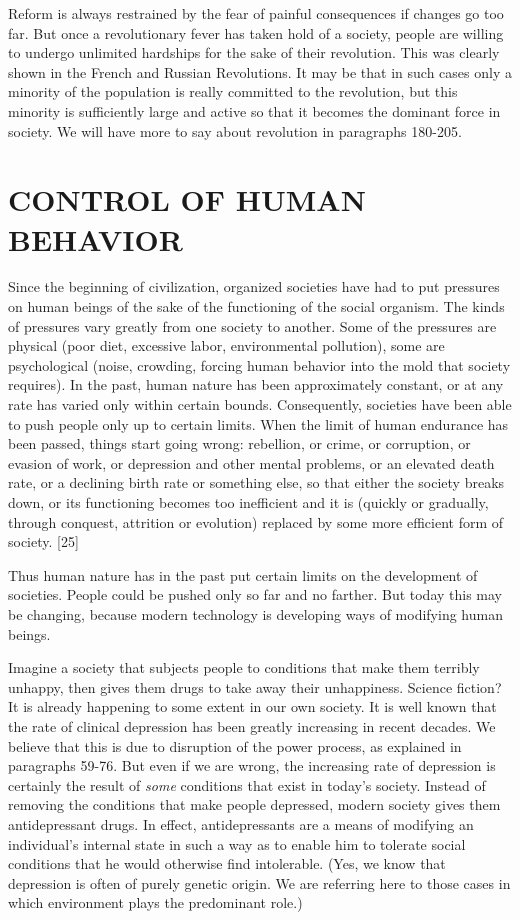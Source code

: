  Reform is always restrained by the fear of painful consequences if changes go too far. But once a revolutionary fever has taken hold of a society, people are willing to undergo unlimited hardships for the sake of their revolution. This was clearly shown in the French and Russian Revolutions. It may be that in such cases only a minority of the population is really committed to the revolution, but this minority is sufficiently large and active so that it becomes the dominant force in society. We will have more to say about revolution in paragraphs 180-205.

\chapter{CONTROL OF HUMAN BEHAVIOR}

 Since the beginning of civilization, organized societies have had to put pressures on human beings of the sake of the functioning of the social organism. The kinds of pressures vary greatly from one society to another. Some of the pressures are physical (poor diet, excessive labor, environmental pollution), some are psychological (noise, crowding, forcing human behavior into the mold that society requires). In the past, human nature has been approximately constant, or at any rate has varied only within certain bounds. Consequently, societies have been able to push people only up to certain limits. When the limit of human endurance has been passed, things start going wrong: rebellion, or crime, or corruption, or evasion of work, or depression and other mental problems, or an elevated death rate, or a declining birth rate or something else, so that either the society breaks down, or its functioning becomes too inefficient and it is (quickly or gradually, through conquest, attrition or evolution) replaced by some more efficient form of society. [25]

 Thus human nature has in the past put certain limits on the development of societies. People could be pushed only so far and no farther. But today this may be changing, because modern technology is developing ways of modifying human beings.

 Imagine a society that subjects people to conditions that make them terribly unhappy, then gives them drugs to take away their unhappiness. Science fiction? It is already happening to some extent in our own society. It is well known that the rate of clinical depression has been greatly increasing in recent decades. We believe that this is due to disruption of the power process, as explained in paragraphs 59-76. But even if we are wrong, the increasing rate of depression is certainly the result of {\em some} conditions that exist in today’s society. Instead of removing the conditions that make people depressed, modern society gives them antidepressant drugs. In effect, antidepressants are a means of modifying an individual’s internal state in such a way as to enable him to tolerate social conditions that he would otherwise find intolerable. (Yes, we know that depression is often of purely genetic origin. We are referring here to those cases in which environment plays the predominant role.)

